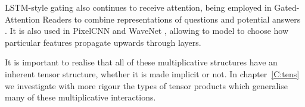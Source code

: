 LSTM-style gating also continues to receive attention, being employed in Gated-Attention Readers
to combine representations of questions and potential answers \autocite{Dhingra2016}. It is also used
in PixelCNN and WaveNet \autocite{VandenOord2016, Oord2016}, allowing to model to choose how
particular features propagate upwards through layers.

It is important to realise that all of these multiplicative structures have an inherent tensor
structure, whether it is made implicit or not. In chapter~\ref{C:tens} we investigate with more
rigour the types of tensor products which generalise many of these multiplicative interactions.


